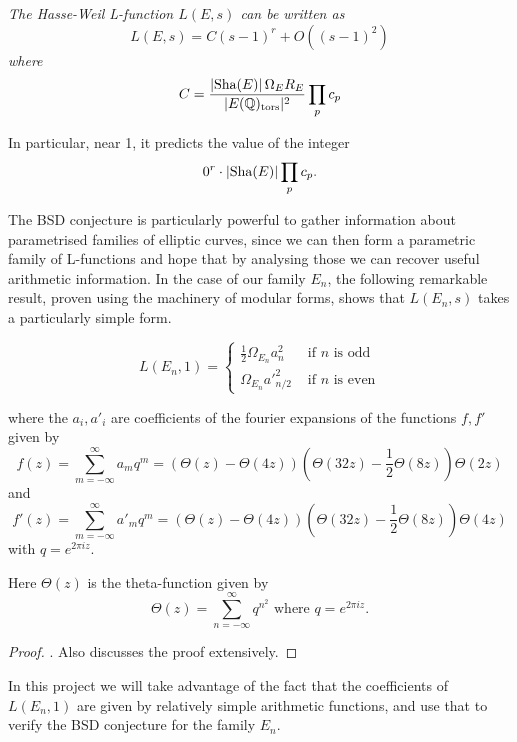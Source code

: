 \documentclass[12pt, a4paper]{amsart}
\begin{document}
\begin{conj} \normalfont
  \textit{The Hasse-Weil L-function $L(E,s)$ can be written as
  \[L(E,s) = C (s-1)^r + O((s-1)^2)\] where}
  \[C = \frac{|\text{Sha}(E)| \, \Omega_E R_E}{|E({\mathbb Q})_{\text{tors}}|^2} \prod_p c_p\]
\end{conj}

In particular, near 1, it predicts the value of the integer
\[0^r \cdot | \text{\normalfont Sha}(E)| \prod_p c_p .\]

The BSD conjecture is particularly powerful to gather information about
parametrised families of elliptic curves, since we can then form a parametric
family of L-functions and hope that by analysing those we can recover useful
arithmetic information.
In the case of our family $E_n$, the following remarkable result, proven using
the machinery of modular forms, shows that
$L(E_n,s)$ takes a particularly simple form.

\begin{thm}
  \begin{equation} \label{eq:tunnell}
    L(E_n,1) = \begin{cases}
      \frac{1}{2}\Omega_{E_n}a^2_n & \text{ if $n$ is odd} \\
      \Omega_{E_n}a'^2_{n/2} & \text{ if $n$ is even}
    \end{cases}
  \end{equation}

  where the $a_i, a'_i$ are coefficients of the fourier expansions of the
  functions $f, f'$ given by
  \[f(z) = \sum\limits_{m=-\infty}^\infty a_m q^m
    = (\Theta(z) - \Theta(4z)) (\Theta(32z)-\frac{1}{2} \Theta(8z)) \Theta(2z)\]
  and
  \[f'(z) = \sum\limits_{m=-\infty}^\infty a'_m q^m =
    (\Theta(z) - \Theta(4z)) (\Theta(32z)-\frac{1}{2} \Theta(8z)) \Theta(4z)\]
  with $q = e^{2\pi i z}$.
  
  Here $\Theta(z)$ is the theta-function given by
  \[ \Theta(z) = \sum\limits_{n = -\infty}^{\infty} q^{n^2} \text{ where } q =
    e^{2\pi iz}.\]
\end{thm}

\begin{proof}
  \cite[See][pages 325-328]{Tunnell}. Also \cite[pages 212-222]{modular}
  discusses the proof extensively.
\end{proof}
  
In this project we will take advantage of the fact that the coefficients of
$L(E_n,1)$ are given by relatively simple arithmetic functions, and use that
to verify the BSD conjecture for the family $E_n$.
\end{document}
